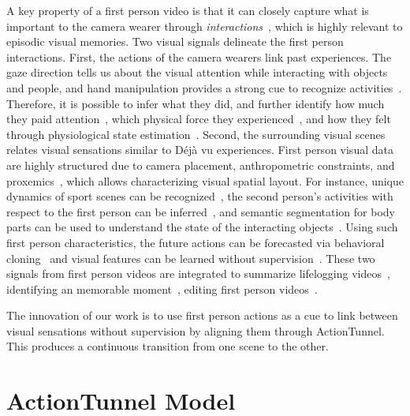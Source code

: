 \documentclass[10pt,twocolumn,letterpaper]{article}
\begin{document}
A key property of a first person video is that it can closely capture what is important to the camera wearer through {\em interactions}~\cite{lee:2012,bertasius:2016}, which is highly relevant to episodic visual memories. Two visual signals delineate the first person interactions. First, the actions of the camera wearers link past experiences. The gaze direction tells us about the visual attention while interacting with objects~\cite{li:2013,fathi:2011} and people\cite{fathi:2012,park:2012,park:2013}, and hand manipulation provides a strong cue to recognize activities~\cite{fathi:2011,rogez:2016,ma:2016,li:2015}. Therefore, it is possible to infer what they did, and further identify how much they paid attention~\cite{su_grauman:2016}, which physical force they experienced~\cite{park:2016_physics}, and how they felt through physiological state estimation~\cite{hernandez:2014}. Second, the surrounding visual scenes relates visual sensations similar to D\'ej\`a vu experiences. First person visual data are highly structured due to camera placement, anthropometric constraints, and proxemics~\cite{hall:1963}, which allows characterizing visual spatial layout. For instance, unique dynamics of sport scenes can be recognized~\cite{kitani:2011}, the second person's activities with respect to the first person can be inferred~\cite{ryoo:2013}, and semantic segmentation for body parts can be used to understand the state of the interacting objects~\cite{li:2013, li_cvpr:2013}. Using such first person characteristics, the future actions can be forecasted via behavioral cloning~\cite{park:2016_future,singh:2016} and visual features can be learned without supervision~\cite{jayaraman:2015,agrawal:2015}. These two signals from first person videos are integrated to summarize lifelogging videos~\cite{zhang:2016, lu:2013}, identifying an memorable moment~\cite{xiong:2014}, editing first person videos~\cite{kopf:2014,arev:2014}.

The innovation of our work is to use first person actions as a cue to link between visual sensations without supervision by aligning them through ActionTunnel. This produces a continuous transition from one scene to the other. 

\section{ActionTunnel Model}\label{sec:actiontunnel}
\end{document}
